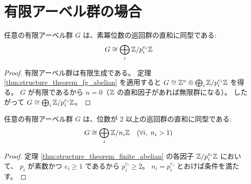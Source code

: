 \section{有限アーベル群の場合}

\begin{theorem}[有限アーベル群の構造定理]
\label{thm:structure_theorem_finite_abelian}
任意の有限アーベル群 $G$ は、素冪位数の巡回群の直和に同型である:
\[
  G \cong \bigoplus_{i} \mathbb{Z} / p_i^{e_i}\mathbb{Z}
\]
\end{theorem}

\begin{proof}
有限アーベル群は有限生成である。
定理 \ref{thm:structure_theorem_fg_abelian} を適用すると
$G \cong \mathbb{Z}^n \oplus \bigoplus_i \mathbb{Z}/p_i^{e_i}\mathbb{Z}$ を得る。
$G$ が有限であるから $n = 0$（$\mathbb{Z}$ の直和因子があれば無限群になる）。
したがって $G \cong \bigoplus_i \mathbb{Z}/p_i^{e_i}\mathbb{Z}$。
\end{proof}

\begin{theorem}
\label{thm:structure_theorem_finite_abelian_nat}
任意の有限アーベル群 $G$ は、位数が $2$ 以上の巡回群の直和に同型である:
\[
  G \cong \bigoplus_{i} \mathbb{Z} / n_i\mathbb{Z} \quad (\forall i,\; n_i > 1)
\]
\end{theorem}

\begin{proof}
定理 \ref{thm:structure_theorem_finite_abelian} の各因子 $\mathbb{Z}/p_i^{e_i}\mathbb{Z}$ において、
$p_i$ が素数かつ $e_i \geq 1$ であるから $p_i^{e_i} \geq 2$。
$n_i = p_i^{e_i}$ とおけば条件を満たす。
\end{proof}
